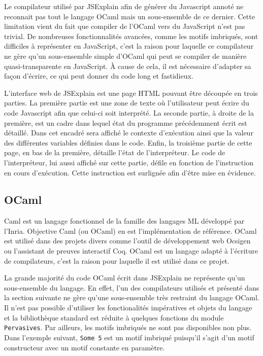 \documentclass{easychair}
\begin{document}
Le compilateur utilisé par JSExplain afin de générer du Javascript annoté ne 
reconnait pas tout le langage OCaml mais un sous-ensemble de ce dernier. Cette 
limitation vient du fait que compiler de l'OCaml vers du JavaScript n'est pas 
trivial. De nombreuses fonctionnalités avancées, comme les motifs imbriqués, 
sont difficiles à représenter en JavaScript, c'est la raison pour laquelle ce 
compilateur ne gère qu'un sous-ensemble simple d'OCaml qui peut se compiler de 
manière quasi-transparente en JavaScript. À cause de cela, il est nécessaire 
d'adapter sa façon d'écrire, ce qui peut donner du code long et fastidieux.

L'interface web de JSExplain est une page HTML pouvant être découpée en trois
parties. La première partie est une zone de texte où l'utilisateur peut écrire
du code Javascript afin que celui-ci soit interprété. La seconde partie, à
droite de la première, est un cadre dans lequel état du programme précédemment
écrit est détaillé. Dans cet encadré sera affiché le contexte d'exécution ainsi
que la valeur des différentes variables définies dans le code. Enfin, la
troisième partie de cette page, en bas de la première, détaille l'état de
l'interpréteur. Le code de l'interpréteur, lui aussi affiché sur cette partie, 
défile en fonction de l'instruction en cours d'exécution. Cette instruction est 
surlignée afin d'être mise en évidence.

\subsection{OCaml}
Caml est un langage fonctionnel de la famille des langages ML développé par 
l'Inria. Objective Caml (ou OCaml) en est l'implémentation de référence. OCaml 
est utilisé dans des projets divers comme l'outil de développement web Ocsigen 
ou l'assistant de preuves interactif Coq. OCaml est un langage adapté à 
l'écriture de compilateurs, c'est la raison pour laquelle il est utilisé dans ce 
projet.

La grande majorité du code OCaml écrit dans JSExplain ne représente qu'un 
sous-ensemble du langage. En effet, l'un des compilateurs utilisés et présenté 
dans la section suivante ne gère qu'une sous-ensemble très restraint du langage 
OCaml. Il n'est pas possible d'utiliser les fonctionalités impératives et 
objets du langage et la bibliothèque standard est réduite à quelques fonctions 
du module \verb|Pervasives|. Par ailleurs, les motifs imbriqués ne sont pas 
disponibles non plus. Dans l'exemple suivant, \verb|Some 5| est un motif 
imbriqué puisqu'il s'agit d'un motif constructeur avec un motif constante en 
paramètre.
\end{document}
